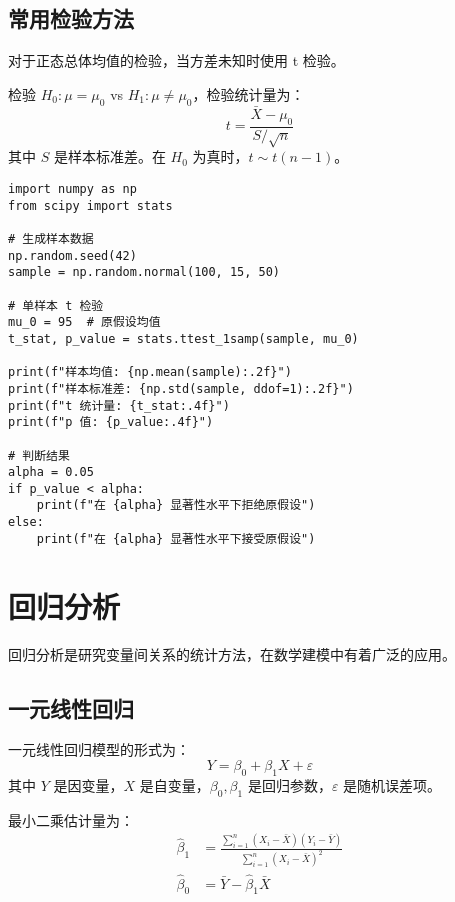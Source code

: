 \subsection{常用检验方法}

\begin{example}[t 检验]\label{ex:t-test}
对于正态总体均值的检验，当方差未知时使用 t 检验。

检验 $H_0: \mu = \mu_0$ vs $H_1: \mu \neq \mu_0$，检验统计量为：
\[
t = \frac{\bar{X} - \mu_0}{S/\sqrt{n}}
\]
其中 $S$ 是样本标准差。在 $H_0$ 为真时，$t \sim t(n-1)$。
\end{example}

\begin{codebox}[title=t 检验的 Python 实现]
\begin{verbatim}
import numpy as np
from scipy import stats

# 生成样本数据
np.random.seed(42)
sample = np.random.normal(100, 15, 50)

# 单样本 t 检验
mu_0 = 95  # 原假设均值
t_stat, p_value = stats.ttest_1samp(sample, mu_0)

print(f"样本均值: {np.mean(sample):.2f}")
print(f"样本标准差: {np.std(sample, ddof=1):.2f}")
print(f"t 统计量: {t_stat:.4f}")
print(f"p 值: {p_value:.4f}")

# 判断结果
alpha = 0.05
if p_value < alpha:
    print(f"在 {alpha} 显著性水平下拒绝原假设")
else:
    print(f"在 {alpha} 显著性水平下接受原假设")
\end{verbatim}
\end{codebox}

\section{回归分析}\label{sec:regression-analysis}

回归分析是研究变量间关系的统计方法，在数学建模中有着广泛的应用。

\subsection{一元线性回归}

\begin{definition}[一元线性回归模型]\label{def:simple-linear-regression}
一元线性回归模型的形式为：
\[
Y = \beta_0 + \beta_1 X + \varepsilon
\]
其中 $Y$ 是因变量，$X$ 是自变量，$\beta_0, \beta_1$ 是回归参数，$\varepsilon$ 是随机误差项。
\end{definition}

\begin{theorem}[最小二乘估计]\label{thm:least-squares}
最小二乘估计量为：
\begin{align}
\hat{\beta}_1 &= \frac{\sum_{i=1}^n (X_i - \bar{X})(Y_i - \bar{Y})}{\sum_{i=1}^n (X_i - \bar{X})^2} \\
\hat{\beta}_0 &= \bar{Y} - \hat{\beta}_1 \bar{X}
\end{align}
\end{theorem}

